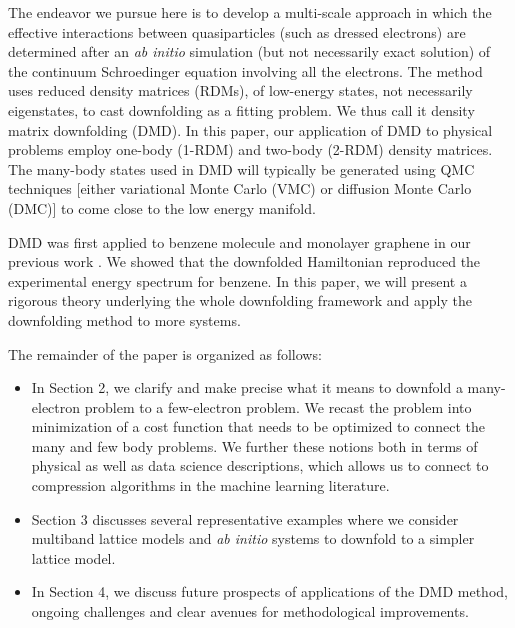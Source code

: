 The endeavor we pursue here is to develop a multi-scale approach in which the effective interactions between quasiparticles (such as dressed electrons) are determined after an \textit{ab initio} simulation (but not necessarily exact solution) of the continuum Schroedinger equation involving all the electrons. 
The method uses reduced density matrices (RDMs), of low-energy states, not necessarily eigenstates, 
to cast downfolding as a fitting problem.  
We thus call it density matrix downfolding (DMD). 
In this paper, our application of DMD to physical problems employ one-body (1-RDM) and two-body (2-RDM) density matrices. 
The many-body states used in DMD will typically be generated using QMC techniques [either variational Monte Carlo (VMC) or diffusion Monte Carlo (DMC)] to come close to the low energy manifold. 

DMD was first applied to benzene molecule and monolayer graphene in our previous work \cite{Changlani2015}. 
We showed that the downfolded Hamiltonian reproduced the experimental energy spectrum for benzene. 
In this paper, we will present a rigorous theory underlying the whole downfolding framework and apply the downfolding method to more systems. 

The remainder of the paper is organized as follows:
\begin{itemize} 
\item In Section 2, we clarify and make precise what it means to downfold 
a many-electron problem to a few-electron problem. We recast the problem into minimization 
of a cost function that needs to be optimized to connect the many and few body problems. We further 
these notions both in terms of physical as well as data science descriptions, which allows us to connect to compression algorithms in the machine learning literature. 
\item Section 3 discusses several representative examples where we consider multiband lattice models 
and {\it ab initio} systems to downfold to a simpler lattice model. 
\item In Section 4, we discuss future prospects of applications of the DMD method, ongoing challenges 
and clear avenues for methodological improvements. 
\end{itemize}


